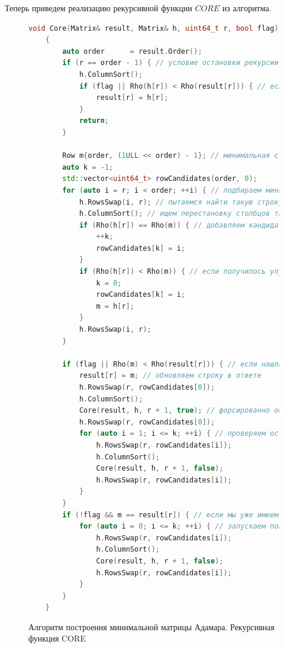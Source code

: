 Теперь приведем реализацию рекурсивной функции $CORE$ из алгоритма. 

\begin{figure}[H]
    \centering
    \begin{minipage}{\linewidth}
    \begin{lstlisting}[language=c++, tabsize=4, showspaces=false, basicstyle=\fontsize{9.5}{7.0}\selectfont, numbers=none]
    void Core(Matrix& result, Matrix& h, uint64_t r, bool flag)
    {
        auto order      = result.Order();
        if (r == order - 1) { // условие остановки рекурсии
            h.ColumnSort();
            if (flag || Rho(h[r]) < Rho(result[r])) { // если нашли меньшую строку
                result[r] = h[r];
            }
            return;
        }
    
        Row m{order, (1ULL << order) - 1}; // минимальная строка для $r$-ой позиции
        auto k = -1;
        std::vector<uint64_t> rowCandidates(order, 0);
        for (auto i = r; i < order; ++i) { // подбираем минимальную строку для $r$-ой позиции
            h.RowsSwap(i, r); // пытаемся найти такую строку, чтобы она была минимальной для r-ой позиции
            h.ColumnSort(); // ищем перестановку столбцов такую, чтобы матрица была как можно меньше
            if (Rho(h[r]) == Rho(m)) { // добавляем кандидата
                ++k;
                rowCandidates[k] = i;
            }
            if (Rho(h[r]) < Rho(m)) { // если получилось улучшить ответ, то обновляем кандидатов
                k = 0;
                rowCandidates[k] = i;
                m = h[r];
            }
            h.RowsSwap(i, r);
        }
    
        if (flag || Rho(m) < Rho(result[r])) { // если нашли меньшую строку
            result[r] = m; // обновляем строку в ответе
            h.RowsSwap(r, rowCandidates[0]);
            h.ColumnSort();
            Core(result, h, r + 1, true); // форсированно обновляем строки от r+1 результата
            h.RowsSwap(r, rowCandidates[0]);
            for (auto i = 1; i <= k; ++i) { // проверяем остальных кандидатов
                h.RowsSwap(r, rowCandidates[i]);
                h.ColumnSort();
                Core(result, h, r + 1, false);
                h.RowsSwap(r, rowCandidates[i]);
            }
        }
        if (!flag && m == result[r]) { // если мы уже имеем минимальную строку на r-ой позиции
            for (auto i = 0; i <= k; ++i) { // запускаем поиск минимальных строк для подматрицы
                h.RowsSwap(r, rowCandidates[i]);
                h.ColumnSort();
                Core(result, h, r + 1, false);
                h.RowsSwap(r, rowCandidates[i]);
            }
        }
    }
    \end{lstlisting}
    \end{minipage}
    \caption{Алгоритм построения минимальной матрицы Адамара. Рекурсивная функция CORE}
    \label{alg:mm_finder_core}
\end{figure}

